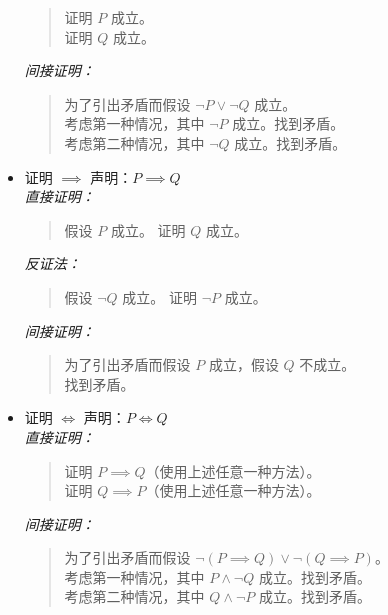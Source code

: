 \begin{itemize}
            \begin{quote}
                证明 $P$ 成立。\\
                证明 $Q$ 成立。
            \end{quote}
            \emph{间接证明：}
            \begin{quote}
                为了引出矛盾而假设 $\neg P \lor \neg Q$ 成立。\\
                考虑第一种情况，其中 $\neg P$ 成立。找到矛盾。\\
                考虑第二种情况，其中 $\neg Q$ 成立。找到矛盾。
            \end{quote}
    \item 证明 $\implies$ 声明：$P \implies Q$\\
            \emph{直接证明：}
            \begin{quote}
                假设 $P$ 成立。 证明 $Q$ 成立。
            \end{quote}
            \emph{反证法：}
            \begin{quote}
                假设 $\neg Q$ 成立。 证明 $\neg P$ 成立。
            \end{quote}
            \emph{间接证明：}
            \begin{quote}
                为了引出矛盾而假设 $P$ 成立，假设 $Q$ 不成立。\\
                找到矛盾。
            \end{quote}
    \item 证明 $\iff$ 声明：$P \iff Q$\\
            \emph{直接证明：}
            \begin{quote}
                证明 $P \implies Q$（使用上述任意一种方法）。\\
                证明 $Q \implies P$（使用上述任意一种方法）。
            \end{quote}
            \emph{间接证明：}
            \begin{quote}
                为了引出矛盾而假设 $\neg (P \implies Q) \lor \neg (Q \implies P)$。\\
                考虑第一种情况，其中 $P \land \neg Q$ 成立。找到矛盾。\\
                考虑第二种情况，其中 $Q \land \neg P$ 成立。找到矛盾。
            \end{quote}
\end{itemize}
